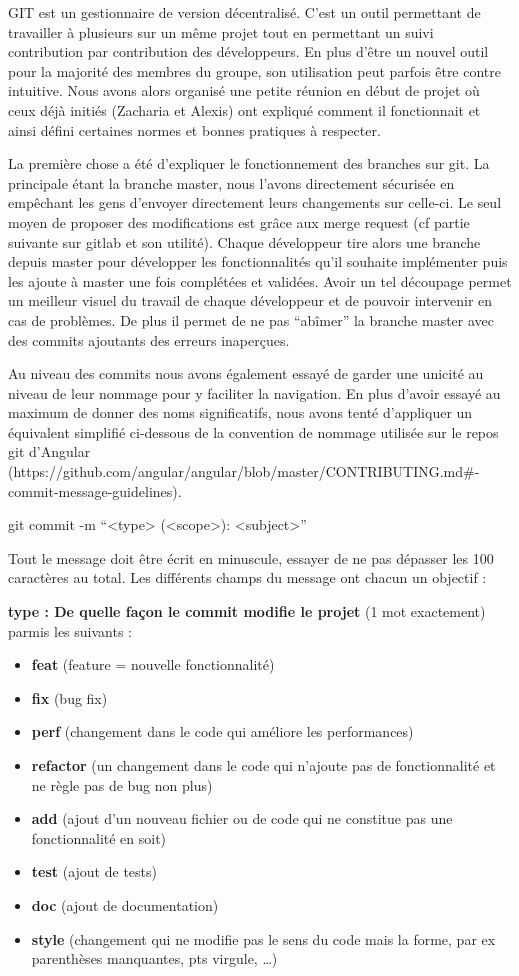 \hspace{3em}
GIT est un gestionnaire de version décentralisé. C’est un outil permettant de travailler à plusieurs sur un même projet tout en permettant un suivi contribution par contribution des développeurs. En plus d’être un nouvel outil pour la majorité des membres du groupe, son utilisation peut parfois être contre intuitive. Nous avons alors organisé une petite réunion en début de projet où ceux déjà initiés (Zacharia et Alexis) ont expliqué comment il fonctionnait et ainsi défini certaines normes et bonnes pratiques à respecter.

	La première chose a été d’expliquer le fonctionnement des branches sur git. La principale étant la branche master, nous l’avons directement sécurisée en empêchant les gens d’envoyer directement leurs changements sur celle-ci. Le seul moyen de proposer des modifications est grâce aux merge request (cf partie suivante sur gitlab et son utilité). Chaque développeur tire alors une branche depuis master pour développer les fonctionnalités qu’il souhaite implémenter puis les ajoute à master une fois complétées et validées. Avoir un tel découpage permet un meilleur visuel du travail de chaque développeur et de pouvoir intervenir en cas de problèmes. De plus il permet de ne pas “abîmer” la branche master avec des commits ajoutants des erreurs inaperçues.

	Au niveau des commits nous avons également essayé de garder une unicité au niveau de leur nommage pour y faciliter la navigation. En plus d’avoir essayé au maximum de donner des noms significatifs, nous avons tenté d’appliquer un équivalent simplifié ci-dessous de la convention de nommage utilisée sur le repos git d’Angular (https://github.com/angular/angular/blob/master/CONTRIBUTING.md\#-commit-message-guidelines).

git commit -m “<type> (<scope>): <subject>”

Tout le message doit être écrit en minuscule, essayer de ne pas dépasser les 100 caractères au total. Les différents champs du message ont chacun un objectif :

\textbf{type : De quelle façon le commit modifie le projet} (1 mot exactement) parmis les suivants :
\begin{itemize}
  \item \textbf{feat} (feature = nouvelle fonctionnalité)
  \item \textbf{fix} (bug fix)
  \item \textbf{perf} (changement dans le code qui améliore les performances)
  \item \textbf{refactor} (un changement dans le code qui n’ajoute pas de fonctionnalité et ne règle pas de bug non plus)
  \item \textbf{add} (ajout d’un nouveau fichier ou de code qui ne constitue pas une fonctionnalité en soit)
  \item \textbf{test} (ajout de tests)
  \item \textbf{doc} (ajout de documentation)
  \item \textbf{style} (changement qui ne modifie pas le sens du code mais la forme, par ex parenthèses manquantes, pts virgule, …)
\end{itemize}

